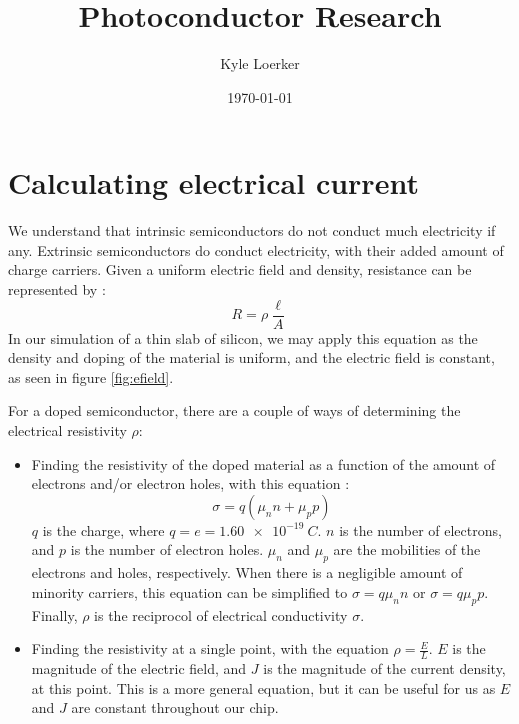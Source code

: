 \documentclass[12pt]{article}
\title{Photoconductor Research}
\author{Kyle Loerker}
\date{\today}
\begin{document}
\maketitle

\section{Calculating electrical current}

We understand that intrinsic semiconductors do not conduct much electricity if any. Extrinsic semiconductors do conduct electricity, with their added amount of charge carriers. Given a uniform electric field and density, resistance can be represented by \citep{wikipedia_resistivity_ideal}:
\begin{equation}
  R=\rho\frac{\ell}{A} \label{eq:resistance}
\end{equation}
In our simulation of a thin slab of silicon, we may apply this equation as the density and doping of the material is uniform, and the electric field is constant, as seen in figure \ref{fig:efield}.

For a doped semiconductor, there are a couple of ways of determining the electrical resistivity $\rho$:
\begin{itemize}
  \item Finding the resistivity of the doped material as a function of the amount of electrons and/or electron holes, with this equation \citep{colorado_resistivity} \citep{wikipedia_resistivity}:
        \begin{equation}
          \sigma=q(\mu_nn+\mu_pp) \label{eq:conductivity}
        \end{equation}
        $q$ is the charge, where $q=e=\SI{1.60e-19}{C}$. $n$ is the number of electrons, and $p$ is the number of electron holes. $\mu_n$ and $\mu_p$ are the mobilities of the electrons and holes, respectively. When there is a negligible amount of minority carriers, this equation can be simplified to $\sigma=q\mu_nn$ or $\sigma=q\mu_pp$. Finally, $\rho$ is the reciprocol of electrical conductivity $\sigma$.
  \item Finding the resistivity at a single point, with the equation $\rho=\frac{E}{L}$. $E$ is the magnitude of the electric field, and $J$ is the magnitude of the current density, at this point. This is a more general equation, but it can be useful for us as $E$ and $J$ are constant throughout our chip.
\end{itemize}
\end{document}
